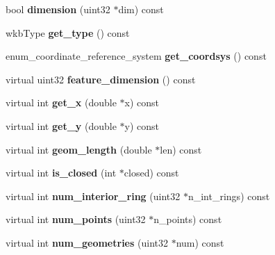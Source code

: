 \begin{DoxyCompactItemize}
\item 
\mbox{\label{classGeometry_a9c274ce8d0d10d4a3aba9f1ac891e145}} 
bool {\bfseries dimension} (uint32 $\ast$dim) const
\item 
\mbox{\label{classGeometry_ab42b36a92e67e34736495ac0a15c8c7d}} 
wkb\+Type {\bfseries get\+\_\+type} () const
\item 
\mbox{\label{classGeometry_a069150d2623b0ea596205be8bbc9c3b2}} 
enum\+\_\+coordinate\+\_\+reference\+\_\+system {\bfseries get\+\_\+coordsys} () const
\item 
\mbox{\label{classGeometry_a4ec39cf17e42e25ed8f7e0ba9b7a0c0e}} 
virtual uint32 {\bfseries feature\+\_\+dimension} () const
\item 
\mbox{\label{classGeometry_a753e60820db1414c435a810edda53144}} 
virtual int {\bfseries get\+\_\+x} (double $\ast$x) const
\item 
\mbox{\label{classGeometry_ab6ad4f4e445f35a32ad2f6a64b13c74d}} 
virtual int {\bfseries get\+\_\+y} (double $\ast$y) const
\item 
\mbox{\label{classGeometry_a636e398274ed389a59aefebd09267527}} 
virtual int {\bfseries geom\+\_\+length} (double $\ast$len) const
\item 
\mbox{\label{classGeometry_a78e0ca627310b317f1492a303d9e74c3}} 
virtual int {\bfseries is\+\_\+closed} (int $\ast$closed) const
\item 
\mbox{\label{classGeometry_a828de3f44ad186ea20a185c4579847fa}} 
virtual int {\bfseries num\+\_\+interior\+\_\+ring} (uint32 $\ast$n\+\_\+int\+\_\+rings) const
\item 
\mbox{\label{classGeometry_a8be47d7f41364814ed47a33d6d466d30}} 
virtual int {\bfseries num\+\_\+points} (uint32 $\ast$n\+\_\+points) const
\item 
\mbox{\label{classGeometry_a53fe964527cf00991842e488e2f83359}} 
virtual int {\bfseries num\+\_\+geometries} (uint32 $\ast$num) const

\end{DoxyCompactItemize}
